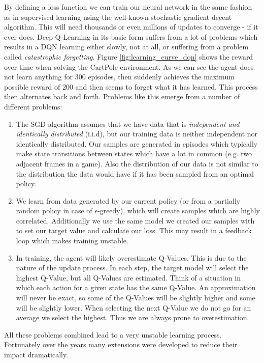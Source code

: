 By defining a loss function we can train our neural network in the same fashion as in supervised learning using the well-known stochastic gradient decent algorithm. This will need thousands or even millions of updates to converge - if it ever does. Deep Q-Learning in its basic form suffers from a lot of problems which results in a DQN learning either slowly, not at all, or suffering from a problem called \textit{catastrophic forgetting}. Figure \ref{fig:learning_curve_dqn} shows the reward over time when solving the CartPole environment. As we can see the agent does not learn anything for 300 episodes, then suddenly achieves the maximum possible reward of 200 and then seems to forget what it has learned. This process then alternates back and forth. Problems like this emerge from a number of different problems:
 \begin{enumerate}
  \item The SGD algorithm assumes that we have data that is \textit{independent and identically distributed} (i.i.d), but our training data is neither independent nor identically distributed. Our samples are generated in episodes which typically make state transitions between states which have a lot in common (e.g. two adjacent frames in a game). Also the distribution of our data is not similar to the distribution the data would have if it has been sampled from an optimal policy. 
  \item We learn from data generated by our current policy (or from a partially random policy in case of $\epsilon$-greedy), which will create samples which are highly correlated. Additionally we use the same model we created our samples with to set our target value and calculate our loss. This may result in a feedback loop which makes training unstable.
  \item In training, the agent will likely overestimate Q-Values. This is due to the nature of the update process. In each step, the target model will select the highest Q-Value, but all Q-Values are estimated. Think of a situation in which each action for a given state has the same Q-Value. An approximation will never be exact, so some of the Q-Values will be slightly higher and some will be slightly lower. When selecting the next Q-Value we do not go for an average we select the highest. Thus we are always prone to overestimation.
 \end{enumerate}

 All these problems combined lead to a very unstable learning process. Fortunately over the years many extensions were developed to reduce their impact dramatically.

